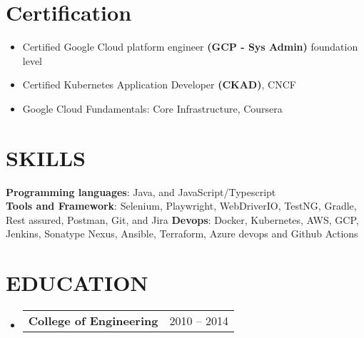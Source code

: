 \documentclass[letterpaper,11pt]{article}
\makeatletter
\newcommand{\resumeItem}[1]{
  \item\small{
    {#1 \vspace{-1pt}}
  }
}
\newcommand{\resumeSubheading}[4]{
  \vspace{-1pt}\item
    \begin{tabular*}{\textwidth}[t]{l@{\extracolsep{\fill}}r}
      \textbf{#1} & {\color{dark-grey}\small #2}\vspace{1pt}\\ %
    \end{tabular*}\vspace{-4pt}
}
\newcommand{\resumeSubHeadingListStart}{\begin{itemize}[leftmargin=0in, label={}]}
\newcommand{\resumeSubHeadingListEnd}{\end{itemize}}
\newcommand{\resumeItemListStart}{\begin{itemize}}
\newcommand{\resumeItemListEnd}{\end{itemize}\vspace{0pt}}
\makeatother
\begin{document}
%
\section{Certification}
  \small
  \resumeItemListStart
    \resumeItem{Certified Google Cloud platform engineer \textbf{(GCP - Sys Admin)} foundation
    level}
    \resumeItem{Certified Kubernetes Application Developer \textbf{(CKAD)}, CNCF}
    \resumeItem{Google Cloud Fundamentals: Core Infrastructure, Coursera}
  \resumeItemListEnd

%
\section{SKILLS}
 \begin{itemize}[leftmargin=0in, label={}]
    \small{\item{
     \textbf{Programming languages}{: Java, and JavaScript/Typescript} \\
     \textbf{Tools and Framework}{: Selenium, Playwright, WebDriverIO, TestNG, Gradle, Rest assured, Postman, Git, and Jira}
     \textbf{Devops}{: Docker, Kubernetes, AWS, GCP, Jenkins, Sonatype Nexus, Ansible, Terraform, Azure devops and Github Actions}
    }}
 \end{itemize}

\section {EDUCATION}
\resumeSubHeadingListStart
  \resumeSubheading
    {College of Engineering}{2010 -- 2014}
    {Bachelor of Science in Information Technology}{}
      
\resumeSubHeadingListEnd

\end{document}
